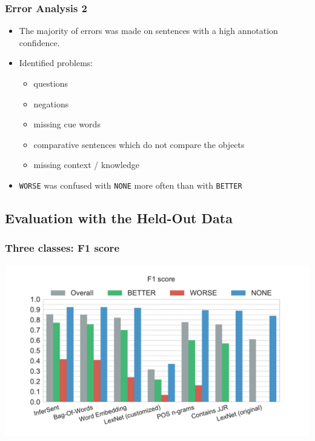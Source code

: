 \documentclass[11pt,aspectratio=169,usenames,dvipsnames]{beamer}
\begin{document}
    
    \begin{frame}[t]
        \frametitle{Error Analysis 2}
        
        \begin{itemize}
         \item The majority of errors was made on sentences with a high annotation confidence.
            \item Identified problems:
            \begin{itemize}
            \item questions
            \item negations
            \item missing cue words
            \item comparative sentences which do not compare the objects
            \item missing context / knowledge
            \end{itemize}
            \item \texttt{WORSE} was confused with \texttt{NONE} more often than with \texttt{BETTER}
        \end{itemize}

        \end{frame}

    \subsection{Evaluation with the Held-Out Data}
    \frame{\subsectionpage}

    \begin{frame}[t]
        \frametitle{Three classes: F1 score}
        \centerline{\includegraphics[scale=0.45,trim={0 0 0 0.5cm},clip]{images/experiments/hp-f1-False}}
    \end{frame}
\end{document}
